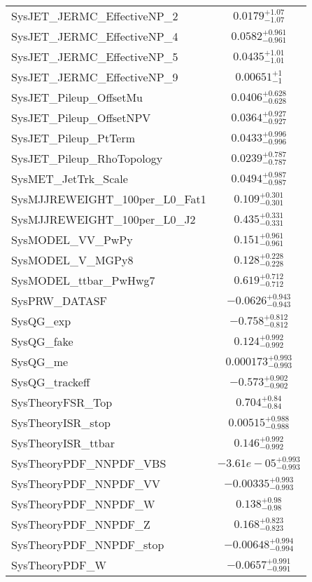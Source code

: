 \begin{tabular}{|l|c|}
SysJET\_JERMC\_EffectiveNP\_2 & $0.0179^{+1.07}_{-1.07}$ \\
SysJET\_JERMC\_EffectiveNP\_4 & $0.0582^{+0.961}_{-0.961}$ \\
SysJET\_JERMC\_EffectiveNP\_5 & $0.0435^{+1.01}_{-1.01}$ \\
SysJET\_JERMC\_EffectiveNP\_9 & $0.00651^{+1}_{-1}$ \\
SysJET\_Pileup\_OffsetMu & $0.0406^{+0.628}_{-0.628}$ \\
SysJET\_Pileup\_OffsetNPV & $0.0364^{+0.927}_{-0.927}$ \\
SysJET\_Pileup\_PtTerm & $0.0433^{+0.996}_{-0.996}$ \\
SysJET\_Pileup\_RhoTopology & $0.0239^{+0.787}_{-0.787}$ \\
SysMET\_JetTrk\_Scale & $0.0494^{+0.987}_{-0.987}$ \\
SysMJJREWEIGHT\_100per\_L0\_Fat1 & $0.109^{+0.301}_{-0.301}$ \\
SysMJJREWEIGHT\_100per\_L0\_J2 & $0.435^{+0.331}_{-0.331}$ \\
SysMODEL\_VV\_PwPy & $0.151^{+0.961}_{-0.961}$ \\
SysMODEL\_V\_MGPy8 & $0.128^{+0.228}_{-0.228}$ \\
SysMODEL\_ttbar\_PwHwg7 & $0.619^{+0.712}_{-0.712}$ \\
SysPRW\_DATASF & $-0.0626^{+0.943}_{-0.943}$ \\
SysQG\_exp & $-0.758^{+0.812}_{-0.812}$ \\
SysQG\_fake & $0.124^{+0.992}_{-0.992}$ \\
SysQG\_me & $0.000173^{+0.993}_{-0.993}$ \\
SysQG\_trackeff & $-0.573^{+0.902}_{-0.902}$ \\
SysTheoryFSR\_Top & $0.704^{+0.84}_{-0.84}$ \\
SysTheoryISR\_stop & $0.00515^{+0.988}_{-0.988}$ \\
SysTheoryISR\_ttbar & $0.146^{+0.992}_{-0.992}$ \\
SysTheoryPDF\_NNPDF\_VBS & $-3.61e-05^{+0.993}_{-0.993}$ \\
SysTheoryPDF\_NNPDF\_VV & $-0.00335^{+0.993}_{-0.993}$ \\
SysTheoryPDF\_NNPDF\_W & $0.138^{+0.98}_{-0.98}$ \\
SysTheoryPDF\_NNPDF\_Z & $0.168^{+0.823}_{-0.823}$ \\
SysTheoryPDF\_NNPDF\_stop & $-0.00648^{+0.994}_{-0.994}$ \\
SysTheoryPDF\_W & $-0.0657^{+0.991}_{-0.991}$ \\

\end{tabular}
